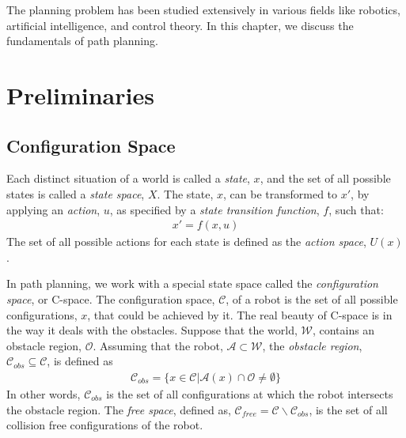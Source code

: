 The planning problem has been studied extensively in various fields like robotics, artificial intelligence, and control theory. In this chapter, we discuss the fundamentals of path planning.

\section{Preliminaries}
\subsection{Configuration Space}
Each distinct situation of a world is called a \textit{state}, $x$, and the set of all possible states is called a \textit{state space}, $X$. The state, $x$, can be transformed to $x'$, by applying an \textit{action}, $u$, as specified by a \textit{state transition function}, $f$, such that:
\begin{align}
	x' = f(x,u)
\end{align}
The set of all possible actions for each state is defined as the \textit{action space}, $U(x)$.



In path planning, we work with a special state space called the \textit{configuration space}, or C-space. The configuration space, $\mathcal{C}$, of a robot is the set of all possible configurations, $x$, that could be achieved by it. The real beauty of C-space is in the way it deals with the obstacles. Suppose that the world, $\mathcal{W}$, contains an obstacle region, $
\mathcal{O}$. Assuming that the robot, $\mathcal{A}\subset\mathcal{W}$, the \textit{obstacle region}, $\mathcal{C}_{obs}\subseteq\mathcal{C}$, is defined as
\begin{align}
	\mathcal{C}_{obs} = \{x\in\mathcal{C} | \mathcal{A}(x)\cap\mathcal{O}\neq\emptyset\}
\end{align}
In other words, $\mathcal{C}_{obs}$ is the set of all configurations at which the robot intersects the obstacle region. The \textit{free space}, defined as, $\mathcal{C}_{free} = \mathcal{C} \backslash  \mathcal{C}_{obs}$, is the set of all collision free configurations of the robot. 


